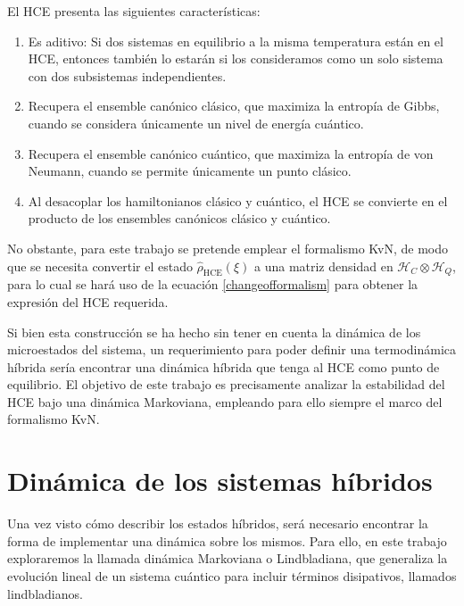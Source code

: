 \documentclass[openany, 11pt]{book}
\numberwithin{equation}{chapter}
\newcommand{\Hc}{\mathcal H_C}
\newcommand{\Hq}{\mathcal H_Q}
\begin{document}
\begin{proposition}El HCE presenta las siguientes características: \begin{enumerate}
    \item Es aditivo: Si dos sistemas en equilibrio a la misma temperatura están en el HCE, entonces también lo estarán si los consideramos como un solo sistema con dos subsistemas independientes.
    \item Recupera el ensemble canónico clásico, que maximiza la entropía de Gibbs, cuando se considera únicamente un nivel de energía cuántico.
    \item Recupera el ensemble canónico cuántico, que maximiza la entropía de von Neumann, cuando se permite únicamente un punto clásico.
    \item Al desacoplar los hamiltonianos clásico y cuántico, el HCE se convierte en el producto de los ensembles canónicos clásico y cuántico. 
\end{enumerate}    
\end{proposition}

No obstante, para este trabajo se pretende emplear el formalismo KvN, de modo que se necesita convertir el estado $\hat \rho_\text{HCE}(\xi)$ a una matriz densidad en $\Hc\otimes\Hq$, para lo cual se hará uso de la ecuación 
\eqref{changeofformalism} para obtener la expresión del HCE requerida.

Si bien esta construcción se ha hecho sin tener en cuenta la dinámica de los microestados del sistema, un requerimiento para poder definir una termodinámica híbrida sería encontrar una dinámica híbrida que tenga al HCE como punto de equilibrio. 
El objetivo de este trabajo es precisamente analizar la estabilidad del HCE bajo una dinámica Markoviana, empleando para ello siempre el marco del formalismo KvN.

\chapter{Dinámica de los sistemas híbridos}

Una vez visto cómo describir los estados híbridos, será necesario encontrar la forma de implementar una dinámica sobre los mismos. Para ello, en este trabajo exploraremos la llamada dinámica Markoviana o Lindbladiana, que generaliza la evolución lineal 
de un sistema cuántico para incluir términos disipativos, llamados lindbladianos.

\newpage


\end{document}

